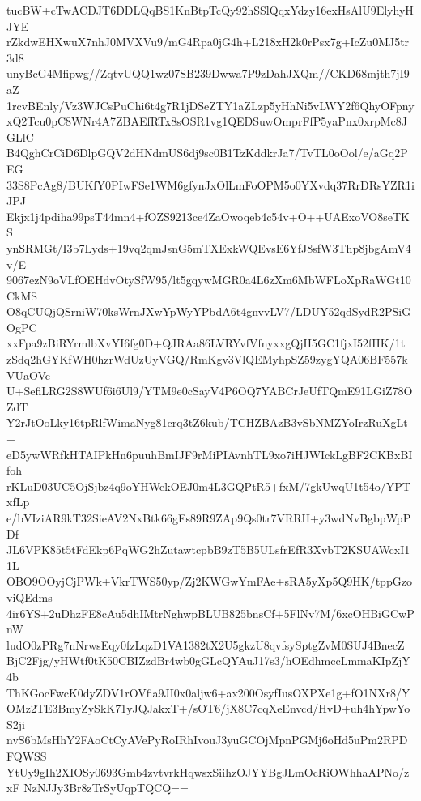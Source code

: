tucBW+cTwACDJT6DDLQqBS1KnBtpTcQy92hSSlQqxYdzy16exHsAlU9ElyhyHJYE
rZkdwEHXwuX7nhJ0MVXVu9/mG4Rpa0jG4h+L218xH2k0rPsx7g+IcZu0MJ5tr3d8
unyBcG4Mfipwg//ZqtvUQQ1wz07SB239Dwwa7P9zDahJXQm//CKD68mjth7jI9aZ
1rcvBEnly/Vz3WJCsPuChi6t4g7R1jDSeZTY1aZLzp5yHhNi5vLWY2f6QhyOFpny
xQ2Tcu0pC8WNr4A7ZBAEfRTx8sOSR1vg1QEDSuwOmprFfP5yaPnx0xrpMc8JGLlC
B4QghCrCiD6DlpGQV2dHNdmUS6dj9sc0B1TzKddkrJa7/TvTL0oOol/e/aGq2PEG
33S8PcAg8/BUKfY0PIwFSe1WM6gfynJxOlLmFoOPM5o0YXvdq37RrDRsYZR1iJPJ
Ekjx1j4pdiha99psT44mn4+fOZS9213ce4ZaOwoqeb4c54v+O++UAExoVO8seTKS
ynSRMGt/I3b7Lyds+19vq2qmJsnG5mTXExkWQEvsE6YfJ8sfW3Thp8jbgAmV4v/E
9067ezN9oVLfOEHdvOtySfW95/lt5gqywMGR0a4L6zXm6MbWFLoXpRaWGt10CkMS
O8qCUQjQSrniW70ksWrnJXwYpWyYPbdA6t4gnvvLV7/LDUY52qdSydR2PSiGOgPC
xxFpa9zBiRYrmlbXvYI6fg0D+QJRAa86LVRYvfVfnyxxgQjH5GC1fjxI52fHK/1t
zSdq2hGYKfWH0hzrWdUzUyVGQ/RmKgv3VlQEMyhpSZ59zygYQA06BF557kVUaOVc
U+SefiLRG2S8WUf6i6Ul9/YTM9e0cSayV4P6OQ7YABCrJeUfTQmE91LGiZ78OZdT
Y2rJtOoLky16tpRlfWimaNyg81crq3tZ6kub/TCHZBAzB3vSbNMZYoIrzRuXgLt+
eD5ywWRfkHTAIPkHn6puuhBmIJF9rMiPIAvnhTL9xo7iHJWIckLgBF2CKBxBIfoh
rKLuD03UC5OjSjbz4q9oYHWekOEJ0m4L3GQPtR5+fxM/7gkUwqU1t54o/YPTxfLp
e/bVIziAR9kT32SieAV2NxBtk66gEs89R9ZAp9Qs0tr7VRRH+y3wdNvBgbpWpPDf
JL6VPK85t5tFdEkp6PqWG2hZutawtcpbB9zT5B5ULsfrEfR3XvbT2KSUAWcxI11L
OBO9OOyjCjPWk+VkrTWS50yp/Zj2KWGwYmFAe+sRA5yXp5Q9HK/tppGzoviQEdms
4ir6YS+2uDhzFE8cAu5dhIMtrNghwpBLUB825bnsCf+5FlNv7M/6xcOHBiGCwPnW
ludO0zPRg7nNrwsEqy0fzLqzD1VA1382tX2U5gkzU8qvfsySptgZvM0SUJ4BnecZ
BjC2Fjg/yHWtf0tK50CBIZzdBr4wb0gGLcQYAuJ17s3/hOEdhmccLmmaKIpZjY4b
ThKGocFwcK0dyZDV1rOVfia9JI0x0aljw6+ax200OsyfIusOXPXe1g+fO1NXr8/Y
OMz2TE3BmyZySkK71yJQJakxT+/sOT6/jX8C7cqXeEnvcd/HvD+uh4hYpwYoS2ji
nvS6bMsHhY2FAoCtCyAVePyRoIRhIvouJ3yuGCOjMpnPGMj6oHd5uPm2RPDFQWSS
YtUy9gIh2XIOSy0693Gmb4zvtvrkHqwsxSiihzOJYYBgJLmOcRiOWhhaAPNo/zxF
NzNJJy3Br8zTrSyUqpTQCQ==
